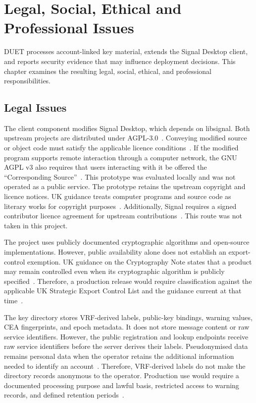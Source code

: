 \chapter{Legal, Social, Ethical and Professional Issues}\label{ch:lsepi}

DUET processes account-linked key material, extends the Signal Desktop client, and reports security
evidence that may influence deployment decisions. This chapter examines the resulting legal, social,
ethical, and professional responsibilities.

\section{Legal Issues}\label{sec:lsepi-legal}

The client component modifies Signal Desktop, which depends on libsignal. Both upstream projects are
distributed under AGPL-3.0~\cite{libsignal,signal-desktop}. Conveying modified source or object code
must satisfy the applicable licence conditions~\cite[Sections~5--6]{agpl3}. If the modified program
supports remote interaction through a computer network, the GNU AGPL v3 also requires
that users interacting with it be offered the ``Corresponding Source''~\cite[Section~13]{agpl3}. This prototype was
evaluated locally and was not operated as a public service. The prototype retains the upstream
copyright and licence notices. UK guidance treats computer programs and source code as literary
works for copyright purposes~\cite{uk-software-copyright}. Additionally, Signal requires a signed contributor
licence agreement for upstream contributions~\cite{signal-cla}. This route was not taken in this
project.

The project uses publicly documented cryptographic algorithms and open-source implementations.
However, public availability alone does not establish an export-control exemption. UK guidance on
the Cryptography Note states that a product may remain controlled even when its cryptographic
algorithm is publicly specified~\cite{uk-cryptonote}. Therefore, a production release would require
classification against the applicable UK Strategic Export Control List and the guidance current at
that time~\cite{uk-export-lists}.

The key directory stores VRF-derived labels, public-key bindings, warning values, CEA fingerprints,
and epoch metadata. It does not store message content or raw service identifiers. However, the
public registration and lookup endpoints receive raw service identifiers before the server derives
their labels. Pseudonymised data remains personal data when the operator retains the additional
information needed to identify an account~\cite{ico-pseudonymisation}. Therefore, VRF-derived
labels do not make the directory records anonymous to the operator. Production use would require a
documented processing purpose and lawful basis, restricted access to warning records, and defined
retention periods~\cite{ico-lawfulness,ico-data-principles}.

